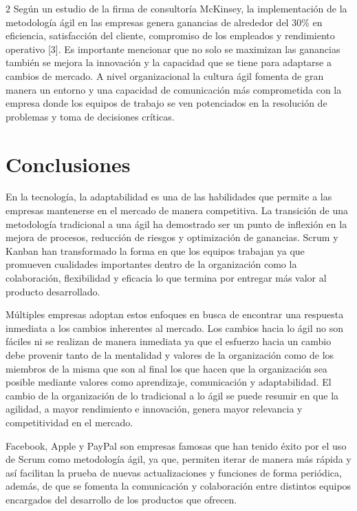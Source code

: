 \documentclass[12pt,spanish,Letterpaper,openany]{book}
\begin{document}
\begin {multicols}{2}
Según un estudio de la firma de consultoría McKinsey, la implementación de la metodología ágil en las empresas genera ganancias de alrededor del 30\% en eficiencia, satisfacción del cliente, compromiso de los empleados y rendimiento operativo {[}3{]}. Es importante mencionar que no solo se maximizan las ganancias también se mejora la innovación y la capacidad que se tiene para adaptarse a cambios de mercado. A nivel organizacional la cultura ágil fomenta de gran manera un entorno y una capacidad de comunicación más comprometida con la empresa donde los equipos de trabajo se ven potenciados en la resolución de problemas y toma de decisiones críticas.

\bigskip
\bigskip

\hypertarget{conclusiones}{%
\section{Conclusiones}\label{conclusiones}}

En la tecnología, la adaptabilidad es una de las habilidades que permite a las empresas mantenerse en el mercado de manera competitiva. La transición de una metodología tradicional a una ágil ha
demostrado ser un punto de inflexión en la mejora de procesos, reducción de riesgos y optimización de ganancias. Scrum y Kanban han transformado la forma en que los equipos trabajan ya que
promueven cualidades importantes dentro de la organización como la colaboración, flexibilidad y eficacia lo que termina por entregar más valor al producto desarrollado.

Múltiples empresas adoptan estos enfoques en busca de encontrar una respuesta inmediata a los cambios inherentes al mercado. Los cambios hacia lo ágil no son fáciles ni se realizan de manera
inmediata ya que el esfuerzo hacia un cambio debe provenir tanto de la mentalidad y valores de la organización como de los miembros de la misma que son al final los que hacen que la organización
sea posible mediante valores como aprendizaje, comunicación y adaptabilidad. El cambio de la organización de lo tradicional a lo ágil se puede resumir en que la agilidad, a mayor rendimiento e
innovación, genera mayor relevancia y competitividad en el mercado.

Facebook, Apple y PayPal son empresas famosas que han tenido éxito por el uso de Scrum como metodología ágil, ya que, permiten iterar de manera más rápida y así facilitan la prueba de nuevas
actualizaciones y funciones de forma periódica, además, de que se fomenta la comunicación y colaboración entre distintos equipos encargados del desarrollo de los productos que ofrecen.


\end{multicols}
\end{document}
